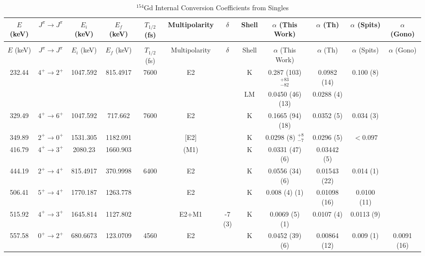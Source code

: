 \begin{sidewaystable}
    \begin{longtable}{c|c|c|c|c|c|c|c|c|c|c|c}
        \caption{$^{154}$Gd Internal Conversion Coefficients from Singles}
        \label{tab:154Gd_Single_ICC}\\
        \toprule
        $E$ (keV)	&	$J^{\pi}	\rightarrow	J^{\pi}$	&	$E_i$ (keV)	&	$E_f$ (keV)	&	$T_{1/2}$ (fs)	&	Multipolarity	&	$\delta$	& Shell &	$\alpha$ (This Work)				&	$\alpha$  (Th)	&	$\alpha$ (Spits) & $\alpha$ (Gono)		\\
        \hline
        \endfirsthead
        \caption[]{$^{154}$Gd Internal Conversion Coefficients from Singles}\\
        \toprule
        $E$ (keV)	&	$J^{\pi}	\rightarrow	J^{\pi}$	&	$E_i$ (keV)	&	$E_f$ (keV)	&	$T_{1/2}$ (fs)	&	Multipolarity	&	$\delta$	& Shell &	$\alpha$ (This Work)				&	$\alpha$  (Th)	&	$\alpha$ (Spits) & $\alpha$ (Gono)	\\
        \hline
	    \endhead
	    \hline
        232.44	&	$4^+	\rightarrow	2^+$	&	1047.592	&	815.4917	&	7600	&	E2	&	& K	&	0.287	(103) $^{+83}_{-82}$	&	0.0982 (14)	&	0.100 (8)	\\
	    &				&		&		&		&		&	& LM &	0.0450	(46) (13)	&	0.0288 (4)	&		\\
	    \hline
        329.49	&	$4^+	\rightarrow	6^+$	&	1047.592	&	717.662	&	7600	&	E2	&		& K &	0.1665	(94) (18)	&	0.0352 (5)	&	0.034 (3)	\\
        \hline
        349.89	&	$2^+	\rightarrow	0^+$	&	1531.305	&	1182.091	&		&	[E2]	&		& K &	0.0298 (8) $^{+8}_{-7}$	&	0.0296 (5)	& $<0.097$ &		\\
        \hline
        416.79	&	$4^+	\rightarrow	3^+$	&	2080.23	&	1660.903	&		&	(M1)	&		& K &	0.0331	(47) (6)	&	0.03442 (5)	&	\\
        \hline
        444.19	&	$2^+	\rightarrow	4^+$	&	815.4917	&	370.9998	&	6400	&	E2	&		& K &	0.0556	(34) (6)	&	0.01543 (22)	&	0.014 (1)	\\
        \hline
        506.41	&	$5^+	\rightarrow	4^+$	&	1770.187	&	1263.778	&		&	E2	&		& K &	0.008	(4) (1)	&	0.01098 (16)	&	0.0100 (11)	\\
        \hline
        515.92	&	$4^+	\rightarrow	3^+$	&	1645.814	&	1127.802	&		&	E2+M1	&	-7 (3)	& K &	0.0069	(5) (1)	&	0.0107 (4)	&	0.0113 (9)	\\
        \hline
        557.58	&	$0^+	\rightarrow	2^+$	&	680.6673	&	123.0709	&	4560	&	E2	&		& K &	0.0452	(39) (6)	&	0.00864 (12)	&	0.009 (1) & 0.0091 (16)	\\

\end{longtable}
\end{sidewaystable}
